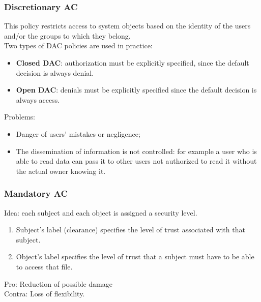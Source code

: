 \documentclass[10pt]{article}
\begin{document}
\subsubsection{Discretionary AC}
This policy restricts access to system objects based on the identity of the users and/or the groups to which they belong. \\
Two types of DAC policies are used in practice:
\begin{itemize}
	\item \textbf{Closed DAC}: authorization must be explicitly specified, since the default decision is always denial. 
	\item \textbf{Open DAC}: denials must be explicitly specified since the default decision is always access.
\end{itemize}
Problems:
\begin{itemize}
	\item Danger of users' mistakes or negligence;
	\item The dissemination of information is not controlled: for example a user who is able to read data can pass it to other users not authorized to read it without the actual owner knowing it.
\end{itemize}
\subsubsection{Mandatory AC}
Idea: each subject and each object is assigned a security level.
\begin{enumerate}
	\item Subject's label (clearance) specifies the level of trust associated with that subject.
	\item Object's label specifies the level of trust that a subject must have to be able to access that file.
\end{enumerate}
Pro: Reduction of possible damage \\
Contra: Loss of flexibility.
\end{document}
